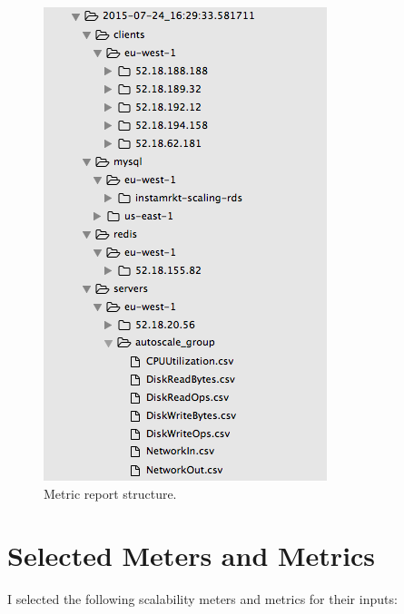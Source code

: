 \documentclass{uvamscse}
\begin{document}
\begin{figure}[H]
\centering
\includegraphics[scale=0.5]{structure}
\caption{Metric report structure.}
\label{figure:structure}
\end{figure}

\section{Selected Meters and Metrics}\label{Selected Meters and Metrics}
I selected the following scalability meters and metrics for their inputs:
\end{document}
